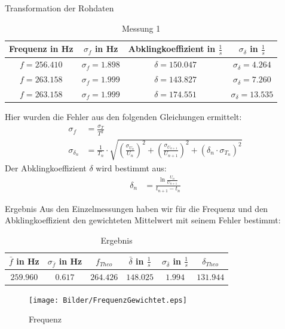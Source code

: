 \documentclass[11pt]{beamer}
\begin{document}
\begin{frame}{Transformation der Rohdaten}
\begin{table}[H]\centering
\caption{Messung 1}
\begin{tabular}{c|c|c|c}
Frequenz in Hz & $\sigma_f$ in Hz & Abklingkoeffizient in $\frac{1}{s}$ & $\sigma_{\delta}$ in $\frac{1}{s}$\\ 
\hline
$f=256.410$& $\sigma_f=1.898$& $\delta=150.047$& $\sigma_{\delta}=4.264$\\ 
$f=263.158$& $\sigma_f=1.999$& $\delta=143.827$& $\sigma_{\delta}=7.260$\\
$f=263.158$& $\sigma_f=1.999$& $\delta=174.551$& $\sigma_{\delta}=13.535$\\
\end{tabular} 
\end{table}

Hier wurden die Fehler aus den folgenden Gleichungen ermittelt:
\begin{align}
\sigma_f&=\frac{\sigma_T}{T^2}\\
\sigma_{\delta_n}&=\frac{1}{T_n}\cdot \sqrt{(\frac{\sigma_{U_n}}{U_n})^2+(\frac{\sigma_{U_{n+1}}}{U_{n+1}})^2+(\delta_n\cdot \sigma_{T_n})^2}
\end{align}
Der Abklingkoeffizient $\delta$ wird bestimmt aus:
\begin{align}
\delta_n&=\frac{\ln{\frac{U_n}{U_{n+1}}}}{t_{n+1}-t_n}
\end{align}
\end{frame}

\begin{frame}{Ergebnis}
Aus den Einzelmessungen haben wir für die Frequenz und den Abklingkoeffizient den gewichteten Mittelwert mit seinem Fehler bestimmt:

\begin{table}[H]\centering
\caption{Ergebnis}
\begin{tabular}{c|c|c|c|c|c}
$\bar{f}$ in Hz & $\sigma_{\bar{f}}$ in Hz & $f_{Theo}$ & $\bar{\delta}$ in $\frac{1}{s}$ & $\sigma_{\bar{\delta}}$ in $\frac{1}{s}$& $\delta_{Theo}$ \\ 
\hline
$259.960$& $0.617$ & $264.426$ & $148.025$& $1.994$& $131.944$\\ 
\end{tabular} 
\end{table}
\end{frame}

\begin{frame}
\begin{figure}[H]
\caption{Frequenz}
\centering
\texttt{[image: Bilder/FrequenzGewichtet.eps]}
\label{Frequenz_Oszi}
\end{figure}
\end{frame}
\end{document}
